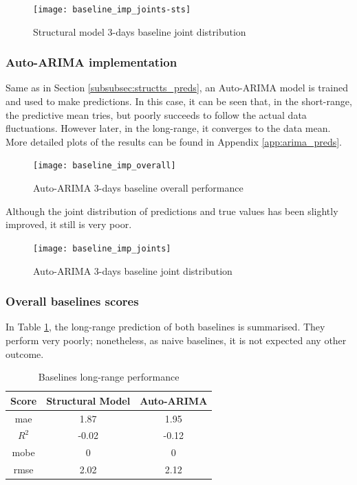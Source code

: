 \begin{figure}[H]
	\centering
	\texttt{[image: baseline\_imp\_joints-sts]}
	\caption{Structural model 3-days baseline joint distribution}
	\label{fig:base_sts_joints}
\end{figure}


\subsubsection*{Auto-ARIMA implementation}

Same as in Section \ref{subsubsec:structts_preds}, an Auto-ARIMA model is trained and used to make predictions. In this case, it can be seen that, in the short-range, the predictive mean tries, but poorly succeeds to follow the actual data fluctuations. However later, in the long-range, it converges to the data mean. More detailed plots of the results can be found in Appendix \ref{app:arima_preds}.   

\begin{figure}[H]
	\centering
	\texttt{[image: baseline\_imp\_overall]}
	\caption{Auto-ARIMA 3-days baseline overall performance}
	\label{fig:base_arima_overall}
\end{figure}

Although the joint distribution of predictions and true values has been slightly improved, it still is very poor.

\begin{figure}[H]
	\centering
	\texttt{[image: baseline\_imp\_joints]}
	\caption{Auto-ARIMA 3-days baseline joint distribution}
	\label{fig:base_arima_joints}
\end{figure}

\subsubsection*{Overall baselines scores}

In Table \ref{table:base_scores}, the long-range prediction of both baselines is summarised. They perform very poorly; nonetheless, as naive baselines, it is not expected any other outcome.

\begin{table}[H]
	\centering
	\begin{tabular}{|c|c|c|}
		\hline
		Score		& Structural Model	& Auto-ARIMA \\
		\hline
		\ac{mae} 	&  1.87 			& 1.95 \\
		$R^2$ 		& -0.02				& -0.12 \\
		\ac{mobe} 	&  0				& 0 \\
		\ac{rmse}	& 2.02 				& 2.12 \\
		\hline
	\end{tabular}
	\caption{Baselines long-range performance}
	\label{table:base_scores}
\end{table}

